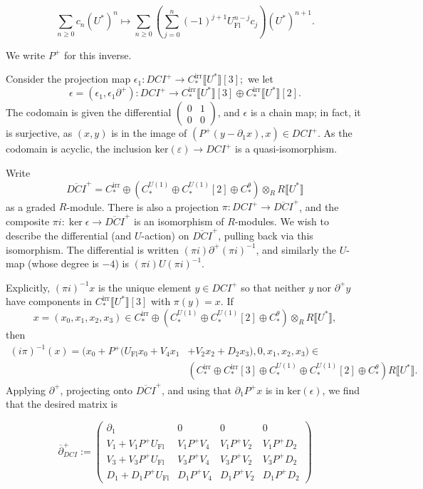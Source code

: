 \documentclass{memo-l}
\theoremstyle{definition}
\theoremstyle{remark}
\numberwithin{section}{chapter}
\numberwithin{equation}{chapter}
\begin{document}
$$\sum_{n \geq 0} c_n (U^*)^n \mapsto \sum_{n \geq 0} \left(\sum_{j=0}^n (-1)^{j+1} U_{\text{Fl}}^{n-j} c_j\right)(U^*)^{n+1}.$$

We write $P^+$ for this inverse.

Consider the projection map $\epsilon_1: DCI^+ \to C_*^{\text{irr}}\llbracket U^*\rrbracket [3];$ we let $$\epsilon = (\epsilon_1, \epsilon_1 \partial^+): DCI^+ \to C_*^{\text{irr}}\llbracket U^*\rrbracket[3] \oplus C_*^{\text{irr}}\llbracket U^*\rrbracket[2].$$ The codomain is given the differential $\begin{pmatrix}0 & 1 \\ 0 & 0 \end{pmatrix}$, and $\epsilon$ is a chain map; in fact, it is surjective, as $(x,y)$ is in the image of $(P^+(y - \partial_1 x), x) \in DCI^+$. As the codomain is acyclic, the inclusion $\text{ker}(\varepsilon) \to DCI^+$ is a quasi-isomorphism. 

Write $$\overline{DCI}^+ = C_*^{\text{irr}} \oplus \left(C_*^{U(1)} \oplus C_*^{U(1)}[2] \oplus C_*^\theta\right) \otimes_R R\llbracket U^*\rrbracket$$ as a graded $R$-module. There is also a projection $\pi: DCI^+ \to \overline{DCI}^+$, and the composite $\pi i: \ker \epsilon \to \overline{DCI}^+$ is an isomorphism of $R$-modules. We wish to describe the differential (and $U$-action) on $\overline{DCI}^+$, pulling back via this isomorphism. The differential is written $(\pi i) \partial^+ (\pi i)^{-1}$, and similarly the $U$-map (whose degree is $-4$) is $(\pi i) U (\pi i)^{-1}$. 

Explicitly, $(\pi i)^{-1}x$ is the unique element $y \in DCI^+$ so that neither $y$ nor $\partial^+ y$ have components in $C_*^{\text{irr}}\llbracket U^*\rrbracket [3]$ with $\pi(y) = x$. If $$x = (x_0, x_1, x_2, x_3) \in C_*^{\text{irr}} \oplus \left(C_*^{U(1)} \oplus C_*^{U(1)}[2] \oplus C_*^\theta\right) \otimes_R R\llbracket U^*\rrbracket,$$ then 
\begin{align*}(i\pi)^{-1}(x) = (x_0+P^+(U_{\text{Fl}}x_0 + V_4 x_1 &+ V_2 x_2 + D_2 x_3), 0, x_1, x_2, x_3) \in \\ &\left(C_*^{\text{irr}} \oplus C_*^{\text{irr}}[3] \oplus C_*^{U(1)} \oplus C_*^{U(1)}[2] \oplus C_*^\theta\right)R\llbracket U^*\rrbracket.\end{align*} 
Applying $\partial^+$, projecting onto $\overline{DCI}^+$, and using that $\partial_1 P^+x$ is in $\text{ker}(\epsilon)$, we find that the desired matrix is

$$\overline\partial^+_{DCI} := \begin{pmatrix}\partial_1 & 0 & 0 & 0\\ 
V_1 + V_1P^+U_{\text{Fl}} & V_1 P^+ V_4 & V_1 P^+ V_2 & V_1 P^+ D_2\\ 
V_3 + V_3P^+U_{\text{Fl}} & V_3 P^+ V_4 & V_3 P^+ V_2 & V_3 P^+ D_2\\ 
D_1 + D_1P^+U_{\text{Fl}} & D_1 P^+ V_4 & D_1 P^+ V_2 & D_1 P^+ D_2\end{pmatrix}$$
\end{document}
